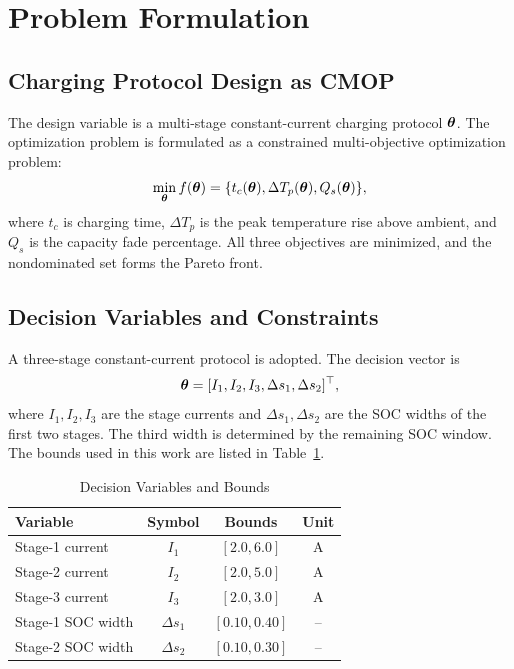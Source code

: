 \section{Problem Formulation}
\label{sec:problem}

\subsection{Charging Protocol Design as CMOP}

The design variable is a multi-stage constant-current charging protocol
$\boldsymbol{\theta}$. The optimization problem is formulated as a constrained
multi-objective optimization problem:
\begin{equation}
\min_{\boldsymbol{\theta}} f(\boldsymbol{\theta})=
\{t_c(\boldsymbol{\theta}),\Delta T_p(\boldsymbol{\theta}),Q_s(\boldsymbol{\theta})\},
\label{eq:cmop}
\end{equation}
where $t_c$ is charging time, $\Delta T_p$ is the peak temperature rise above
ambient, and $Q_s$ is the capacity fade percentage. All three objectives are
minimized, and the nondominated set forms the Pareto front.

\subsection{Decision Variables and Constraints}

A three-stage constant-current protocol is adopted. The decision vector is
\begin{equation}
\boldsymbol{\theta}=[I_1,I_2,I_3,\Delta s_1,\Delta s_2]^\top ,
\label{eq:theta}
\end{equation}
where $I_1,I_2,I_3$ are the stage currents and $\Delta s_1,\Delta s_2$ are the
SOC widths of the first two stages. The third width is determined by the
remaining SOC window. The bounds used in this work are listed in
Table~\ref{tab:variables}.

\begin{table}[htbp]
\caption{Decision Variables and Bounds}
\label{tab:variables}
\centering
\begin{tabular}{lccc}
\toprule
Variable & Symbol & Bounds & Unit \\
\midrule
Stage-1 current & $I_1$ & $[2.0,6.0]$ & A \\
Stage-2 current & $I_2$ & $[2.0,5.0]$ & A \\
Stage-3 current & $I_3$ & $[2.0,3.0]$ & A \\
Stage-1 SOC width & $\Delta s_1$ & $[0.10,0.40]$ & -- \\
Stage-2 SOC width & $\Delta s_2$ & $[0.10,0.30]$ & -- \\
\bottomrule
\end{tabular}
\end{table}

